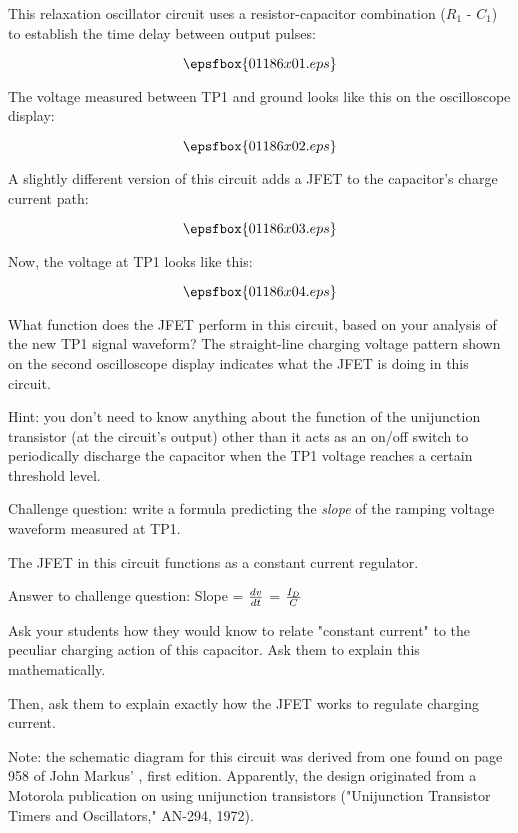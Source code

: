 

This relaxation oscillator circuit uses a resistor-capacitor combination ($R_1$ - $C_1$) to establish the time delay between output pulses:

$$\epsfbox{01186x01.eps}$$

The voltage measured between TP1 and ground looks like this on the oscilloscope display:

$$\epsfbox{01186x02.eps}$$

A slightly different version of this circuit adds a JFET to the capacitor's charge current path:

$$\epsfbox{01186x03.eps}$$

Now, the voltage at TP1 looks like this:

$$\epsfbox{01186x04.eps}$$

What function does the JFET perform in this circuit, based on your analysis of the new TP1 signal waveform?  The straight-line charging voltage pattern shown on the second oscilloscope display indicates what the JFET is doing in this circuit.  

Hint: you don't need to know anything about the function of the unijunction transistor (at the circuit's output) other than it acts as an on/off switch to periodically discharge the capacitor when the TP1 voltage reaches a certain threshold level.

\vskip 10pt

Challenge question: write a formula predicting the {\it slope} of the ramping voltage waveform measured at TP1.







The JFET in this circuit functions as a constant current regulator.

\vskip 10pt

Answer to challenge question: Slope = $dv \over dt$ = ${I_D \over C}$







Ask your students how they would know to relate "constant current" to the peculiar charging action of this capacitor.  Ask them to explain this mathematically.

Then, ask them to explain exactly how the JFET works to regulate charging current.

Note: the schematic diagram for this circuit was derived from one found on page 958 of John Markus' , first edition.  Apparently, the design originated from a Motorola publication on using unijunction transistors ("Unijunction Transistor Timers and Oscillators," AN-294, 1972).




